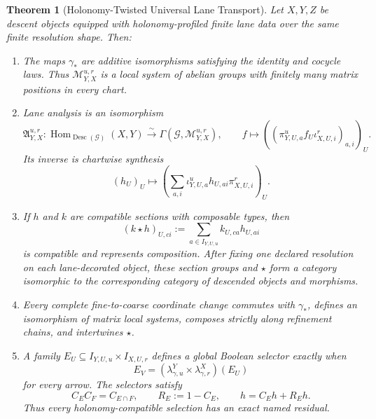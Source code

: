 \documentclass[11pt]{article}
\newtheorem{theorem}{Theorem}[section]
\newcommand{\HomC}{\operatorname{Hom}}
\newcommand{\Desc}{\operatorname{Desc}}
\newcommand{\Analysis}{\mathfrak A}
\begin{document}
\begin{theorem}[Holonomy-Twisted Universal Lane Transport]
\label{thm:twisted-transport}
Let \(X,Y,Z\) be descent objects equipped with holonomy-profiled finite lane data over the same finite resolution shape.  Then:

\begin{enumerate}[label=\textup{(H\arabic*)},leftmargin=3.4em]
\item The maps \(\gamma_*\) are additive isomorphisms satisfying the identity and cocycle laws.  Thus \(\mathscr M^{u,r}_{Y,X}\) is a local system of abelian groups with finitely many matrix positions in every chart.

\item Lane analysis is an isomorphism
\[
 \Analysis^{u,r}_{Y,X}:
 \HomC_{\Desc(\mathscr G)}(X,Y)
 \xrightarrow{\sim}
 \Gamma(\mathscr G,\mathscr M^{u,r}_{Y,X}),
 \qquad
 f\longmapsto\left((\pi^u_{Y,U,a}f_U\iota^r_{X,U,i})_{a,i}\right)_U.
\]
Its inverse is chartwise synthesis
\[
 (h_U)_U\longmapsto
 \left(\sum_{a,i}\iota^u_{Y,U,a}h_{U,ai}\pi^r_{X,U,i}\right)_U.
\]

\item If \(h\) and \(k\) are compatible sections with composable types, then
\[
 (k\star h)_{U,ci}:=\sum_{a\in I_{Y,U,u}}k_{U,ca}h_{U,ai}
\]
is compatible and represents composition.  After fixing one declared resolution on each lane-decorated object, these section groups and \(\star\) form a category isomorphic to the corresponding category of descended objects and morphisms.

\item Every complete fine-to-coarse coordinate change commutes with \(\gamma_*\), defines an isomorphism of matrix local systems, composes strictly along refinement chains, and intertwines \(\star\).

\item A family \(E_U\subseteq I_{Y,U,u}\times I_{X,U,r}\) defines a global Boolean selector exactly when
\[
 E_V=(\lambda^Y_{\gamma,u}\times\lambda^X_{\gamma,r})(E_U)
\]
for every arrow.  The selectors satisfy
\[
 C_EC_F=C_{E\cap F},\qquad R_E:=1-C_E,\qquad h=C_Eh+R_Eh.
\]
Thus every holonomy-compatible selection has an exact named residual.
\end{enumerate}
\end{theorem}
\end{document}
